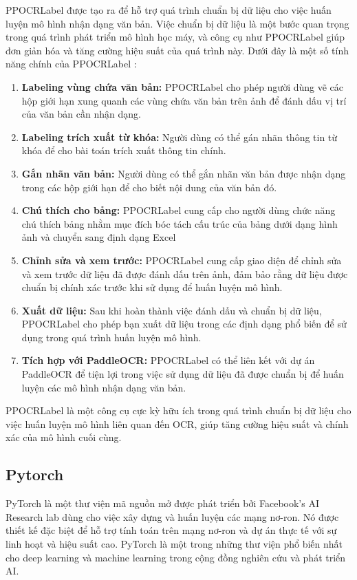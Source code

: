 PPOCRLabel được tạo ra để hỗ trợ quá trình chuẩn bị dữ liệu cho việc huấn luyện mô hình nhận dạng văn bản. Việc chuẩn bị dữ liệu là một bước quan trọng trong quá trình phát triển mô hình học máy, và công cụ như PPOCRLabel giúp đơn giản hóa và tăng cường hiệu suất của quá trình này. Dưới đây là một số tính năng chính của PPOCRLabel \cite{ppocrlabel}:
\begin{enumerate}
    \item \textbf{Labeling vùng chứa văn bản:} PPOCRLabel cho phép người dùng vẽ các hộp giới hạn xung quanh các vùng chứa văn bản trên ảnh để đánh dấu vị trí của văn bản cần nhận dạng.
    \item \textbf{Labeling trích xuất từ khóa:} Người dùng có thể gán nhãn thông tin từ khóa để cho bài toán trích xuất thông tin chính.
    \item \textbf{Gắn nhãn văn bản:} Người dùng có thể gắn nhãn văn bản được nhận dạng trong các hộp giới hạn để cho biết nội dung của văn bản đó.
    \item \textbf{Chú thích cho bảng:} PPOCRLabel cung cấp cho người dùng chức năng chú thích bảng nhằm mục đích bóc tách cấu trúc của bảng dưới dạng hình ảnh và chuyển sang định dạng Excel
    \item \textbf{Chỉnh sửa và xem trước:} PPOCRLabel cung cấp giao diện để chỉnh sửa và xem trước dữ liệu đã được đánh dấu trên ảnh, đảm bảo rằng dữ liệu được chuẩn bị chính xác trước khi sử dụng để huấn luyện mô hình.
    \item \textbf{Xuất dữ liệu:} Sau khi hoàn thành việc đánh dấu và chuẩn bị dữ liệu, PPOCRLabel cho phép bạn xuất dữ liệu trong các định dạng phổ biến để sử dụng trong quá trình huấn luyện mô hình.
    \item \textbf{Tích hợp với PaddleOCR:} PPOCRLabel có thể liên kết với dự án PaddleOCR để tiện lợi trong việc sử dụng dữ liệu đã được chuẩn bị để huấn luyện các mô hình nhận dạng văn bản.
\end{enumerate}

PPOCRLabel là một công cụ cực kỳ hữu ích trong quá trình chuẩn bị dữ liệu cho việc huấn luyện mô hình liên quan đến OCR, giúp tăng cường hiệu suất và chính xác của mô hình cuối cùng.

\subsection{Pytorch}
PyTorch là một thư viện mã nguồn mở được phát triển bởi Facebook's AI Research lab dùng cho việc xây dựng và huấn luyện các mạng nơ-ron. Nó được thiết kế đặc biệt để hỗ trợ tính toán trên mạng nơ-ron và dự án thực tế với sự linh hoạt và hiệu suất cao. PyTorch là một trong những thư viện phổ biến nhất cho deep learning và machine learning trong cộng đồng nghiên cứu và phát triển AI.

